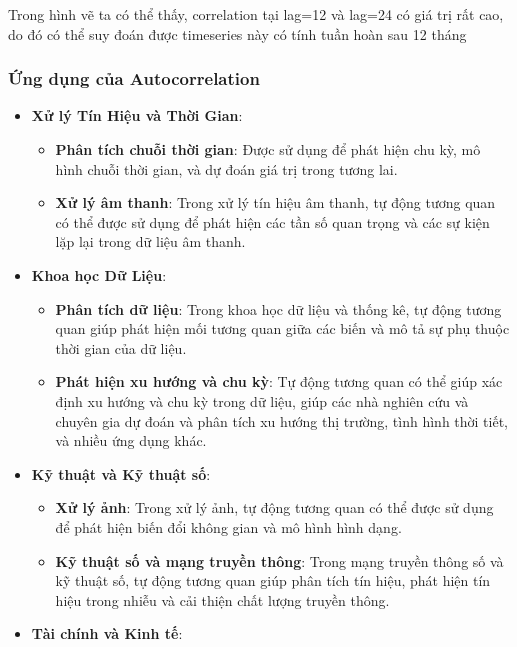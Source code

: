 \documentclass[
]{book}
\providecommand{\tightlist}{%
  \setlength{\itemsep}{0pt}\setlength{\parskip}{0pt}}
\begin{document}
Trong hình vẽ ta có thể thấy, correlation tại lag=12 và lag=24 có giá trị rất cao, do đó có thể suy đoán được timeseries này có tính tuần hoàn sau 12 tháng

\hypertarget{ux1ee9ng-dux1ee5ng-cux1ee7a-autocorrelation}{%
\subsubsection{Ứng dụng của Autocorrelation}\label{ux1ee9ng-dux1ee5ng-cux1ee7a-autocorrelation}}

\begin{itemize}
\tightlist
\item
  \textbf{Xử lý Tín Hiệu và Thời Gian}:

  \begin{itemize}
  \tightlist
  \item
    \textbf{Phân tích chuỗi thời gian}: Được sử dụng để phát hiện chu kỳ, mô hình chuỗi thời gian, và dự đoán giá trị trong tương lai.
  \item
    \textbf{Xử lý âm thanh}: Trong xử lý tín hiệu âm thanh, tự động tương quan có thể được sử dụng để phát hiện các tần số quan trọng và các sự kiện lặp lại trong dữ liệu âm thanh.
  \end{itemize}
\item
  \textbf{Khoa học Dữ Liệu}:

  \begin{itemize}
  \tightlist
  \item
    \textbf{Phân tích dữ liệu}: Trong khoa học dữ liệu và thống kê, tự động tương quan giúp phát hiện mối tương quan giữa các biến và mô tả sự phụ thuộc thời gian của dữ liệu.
  \item
    \textbf{Phát hiện xu hướng và chu kỳ}: Tự động tương quan có thể giúp xác định xu hướng và chu kỳ trong dữ liệu, giúp các nhà nghiên cứu và chuyên gia dự đoán và phân tích xu hướng thị trường, tình hình thời tiết, và nhiều ứng dụng khác.
  \end{itemize}
\item
  \textbf{Kỹ thuật và Kỹ thuật số}:

  \begin{itemize}
  \tightlist
  \item
    \textbf{Xử lý ảnh}: Trong xử lý ảnh, tự động tương quan có thể được sử dụng để phát hiện biến đổi không gian và mô hình hình dạng.
  \item
    \textbf{Kỹ thuật số và mạng truyền thông}: Trong mạng truyền thông số và kỹ thuật số, tự động tương quan giúp phân tích tín hiệu, phát hiện tín hiệu trong nhiễu và cải thiện chất lượng truyền thông.
  \end{itemize}
\item
  \textbf{Tài chính và Kinh tế}:


\end{itemize}
\end{document}
